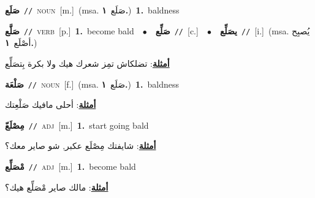 \documentclass[10pt,a4paper,twoside]{article} %
\begin{document}
\begin{multicols}{2}
{\setlength\topsep{0pt}\textbf{\foreignlanguage{arabic}{صَلَع}}\ {\color{gray}\texttt{//}\color{black}}\ \textsc{noun}\ [m.]\ \color{gray}(msa. \foreignlanguage{arabic}{صَلَع}~\foreignlanguage{arabic}{\textbf{١.}})\color{black}\ \textbf{1.}~baldness\ } \vspace{2mm}

{\setlength\topsep{0pt}\textbf{\foreignlanguage{arabic}{صَلَّع}}\ {\color{gray}\texttt{//}\color{black}}\ \textsc{verb}\ [p.]\ \textbf{1.}~become bald\ \ $\bullet$\ \ \setlength\topsep{0pt}\textbf{\foreignlanguage{arabic}{صَلِّع}}\ {\color{gray}\texttt{//}\color{black}}\ [c.]\ \ $\bullet$\ \ \setlength\topsep{0pt}\textbf{\foreignlanguage{arabic}{يصَلِّع}}\ {\color{gray}\texttt{//}\color{black}}\ [i.]\ \color{gray}(msa. \foreignlanguage{arabic}{يُصبِح أصْلَع}~\foreignlanguage{arabic}{\textbf{١.}})\color{black}\  \begin{flushright}\color{gray}\foreignlanguage{arabic}{\textbf{\underline{\foreignlanguage{arabic}{أمثلة}}}: تضلكاش تمِز شعرك هيك ولا بكرة بِتصَلِّع}\end{flushright}\color{black}} \vspace{2mm}

{\setlength\topsep{0pt}\textbf{\foreignlanguage{arabic}{صَلْعَة}}\ {\color{gray}\texttt{//}\color{black}}\ \textsc{noun}\ [f.]\ \color{gray}(msa. \foreignlanguage{arabic}{صَلَع}~\foreignlanguage{arabic}{\textbf{١.}})\color{black}\ \textbf{1.}~baldness\  \begin{flushright}\color{gray}\foreignlanguage{arabic}{\textbf{\underline{\foreignlanguage{arabic}{أمثلة}}}: أحلى مافيك صَلْعِتك}\end{flushright}\color{black}} \vspace{2mm}

{\setlength\topsep{0pt}\textbf{\foreignlanguage{arabic}{مِصْلَعّ}}\ {\color{gray}\texttt{//}\color{black}}\ \textsc{adj}\ [m.]\ \textbf{1.}~start going bald\  \begin{flushright}\color{gray}\foreignlanguage{arabic}{\textbf{\underline{\foreignlanguage{arabic}{أمثلة}}}: شايفتك مِصْلَع عكبر, شو صاير معك؟}\end{flushright}\color{black}} \vspace{2mm}

{\setlength\topsep{0pt}\textbf{\foreignlanguage{arabic}{مْصَلِّع}}\ {\color{gray}\texttt{//}\color{black}}\ \textsc{adj}\ [m.]\ \textbf{1.}~become bald\  \begin{flushright}\color{gray}\foreignlanguage{arabic}{\textbf{\underline{\foreignlanguage{arabic}{أمثلة}}}: مالك صاير مْصَلِّع هيك؟}\end{flushright}\color{black}} \vspace{2mm}


\end{multicols}
\end{document}
